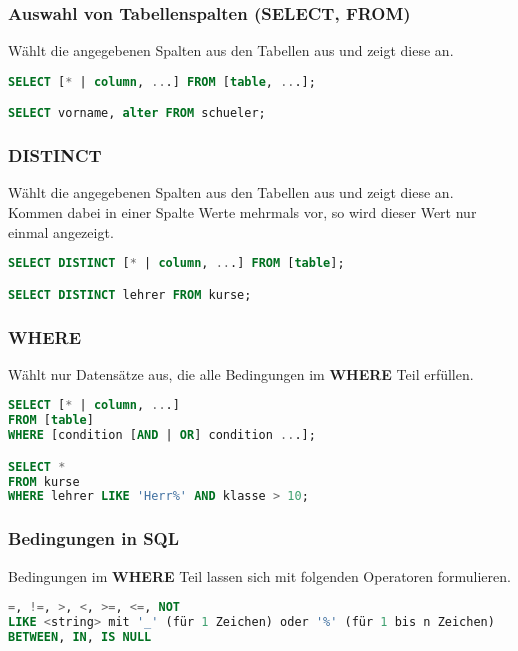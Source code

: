 \subsubsection{Auswahl von Tabellenspalten (SELECT, FROM)}

Wählt die angegebenen Spalten aus den Tabellen aus und zeigt diese an.

\begin{lstlisting}[language=sql]
SELECT [* | column, ...] FROM [table, ...];

SELECT vorname, alter FROM schueler;
\end{lstlisting}

\subsubsection{DISTINCT}

Wählt die angegebenen Spalten aus den Tabellen aus und zeigt diese an.
Kommen dabei in einer Spalte Werte mehrmals vor, so wird dieser Wert nur einmal angezeigt.

\begin{lstlisting}[language=sql]
SELECT DISTINCT [* | column, ...] FROM [table];

SELECT DISTINCT lehrer FROM kurse;
\end{lstlisting}

\subsubsection{WHERE}

Wählt nur Datensätze aus, die alle Bedingungen im \textbf{WHERE} Teil erfüllen.

\begin{lstlisting}[language=sql]
SELECT [* | column, ...]
FROM [table]
WHERE [condition [AND | OR] condition ...];

SELECT *
FROM kurse
WHERE lehrer LIKE 'Herr%' AND klasse > 10;
\end{lstlisting}

\subsubsection{Bedingungen in SQL}

Bedingungen im \textbf{WHERE} Teil lassen sich mit folgenden Operatoren formulieren.

\begin{lstlisting}[language=sql]
=, !=, >, <, >=, <=, NOT
LIKE <string> mit '_' (für 1 Zeichen) oder '%' (für 1 bis n Zeichen)
BETWEEN, IN, IS NULL
\end{lstlisting}

